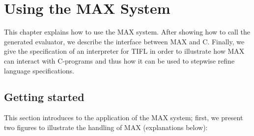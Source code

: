 
\chapter{Using the MAX System}

This chapter explains how to use the MAX system. After showing how to call
the generated evaluator, we describe the interface between MAX and C.
Finally, we give the specification of an interpreter for TIFL in order to
illustrate how MAX can interact with C-programs and thus how it can
be used to stepwise refine language specifications.


\section{Getting started}
         
This section introduces to the application of the MAX system; first, we present two figures to illustrate the handling of MAX (explanations below):
\\


